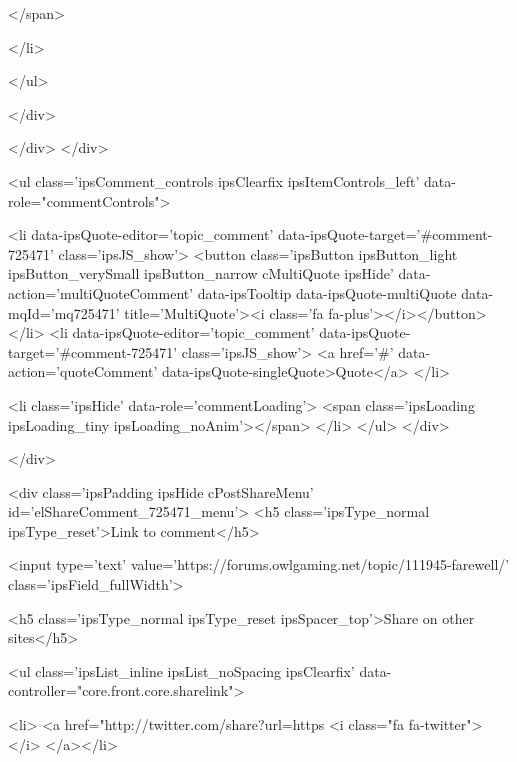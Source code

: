 						</span>
					
				</li>
			
		
	</ul>

					
				</div>
			
			
			
		</div>
	</div>

					
				
				<ul class='ipsComment_controls ipsClearfix ipsItemControls_left' data-role="commentControls">
					
						
							<li data-ipsQuote-editor='topic_comment' data-ipsQuote-target='#comment-725471' class='ipsJS_show'>
								<button class='ipsButton ipsButton_light ipsButton_verySmall ipsButton_narrow cMultiQuote ipsHide' data-action='multiQuoteComment' data-ipsTooltip data-ipsQuote-multiQuote data-mqId='mq725471' title='MultiQuote'><i class='fa fa-plus'></i></button>
							</li>
							<li data-ipsQuote-editor='topic_comment' data-ipsQuote-target='#comment-725471' class='ipsJS_show'>
								<a href='#' data-action='quoteComment' data-ipsQuote-singleQuote>Quote</a>
							</li>
						
						
						
					
					<li class='ipsHide' data-role='commentLoading'>
						<span class='ipsLoading ipsLoading_tiny ipsLoading_noAnim'></span>
					</li>
				</ul>
			</div>
		

		
			

		
	</div>

	

	



<div class='ipsPadding ipsHide cPostShareMenu' id='elShareComment_725471_menu'>
	<h5 class='ipsType_normal ipsType_reset'>Link to comment</h5>
	
		
	
	
	<input type='text' value='https://forums.owlgaming.net/topic/111945-farewell/' class='ipsField_fullWidth'>

	
	<h5 class='ipsType_normal ipsType_reset ipsSpacer_top'>Share on other sites</h5>
	

	<ul class='ipsList_inline ipsList_noSpacing ipsClearfix' data-controller="core.front.core.sharelink">
		
			<li>
<a href="http://twitter.com/share?url=https%
	<i class="fa fa-twitter"></i>
</a></li>
		
